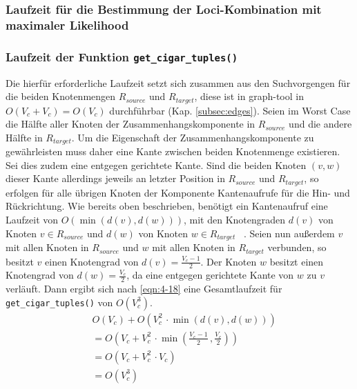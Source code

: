 \subsubsection{Laufzeit für die Bestimmung der Loci-Kombination mit maximaler Likelihood}

\subsubsection{Laufzeit der Funktion \lstinline|get_cigar_tuples()|}

Die hierfür erforderliche Laufzeit setzt sich zusammen aus den Suchvorgengen für die beiden Knotenmengen $ R_{source} $ und $ R_{target} $, diese ist in graph-tool in $O(V_{c} + V_{c}) = O(V_{c})$ durchführbar (Kap. \ref{subsec:edges}). Seien im Worst Case die Hälfte aller Knoten der Zusammenhangskomponente in $ R_{source} $ und die andere Hälfte in $ R_{target} $. Um die Eigenschaft der Zusammenhangskomponente zu gewährleisten muss daher eine Kante zwischen beiden Knotenmenge existieren. Sei dies zudem eine entgegen gerichtete Kante. Sind die beiden Knoten $ (v, w) $ dieser Kante allerdings jeweils an letzter Position in $ R_{source} $ und $ R_{target} $, so erfolgen für alle übrigen Knoten der Komponente Kantenaufrufe für die Hin- und Rückrichtung. Wie bereits oben beschrieben, benötigt ein Kantenaufruf eine Laufzeit von $ O(\min (d(v), d(w)))$, mit den Knotengraden $d(v) $ von Knoten $v \in R_{source}$ und $ d(w) $ von Knoten $ w \in R_{target} $ ~\cite{docs_graph_tool}. Seien nun außerdem $ v $ mit allen Knoten in $ R_{source} $ und $ w $ mit allen Knoten in $ R_{target} $ verbunden, so besitzt $v$ einen Knotengrad von $ d(v) = \frac{V_{c}-1}{2} $. Der Knoten $ w $ besitzt einen Knotengrad von $ d(w) = \frac{V_{c}}{2} $, da eine entgegen gerichtete Kante von $w$ zu $v$ verläuft. Dann ergibt sich nach \eqref{eqn:4-18} eine Gesamtlaufzeit für \lstinline|get_cigar_tuples()| von $ O(V_{c}^3) $. \\

\begin{equation} \label{eqn:4-18}
\tag{4-18}
\begin{aligned}
&\ {} O(V_{c}) + O(V_{c}^2 \, \cdotp \min (d(v), d(w)))  \\
& \ = O\left( V_{c} + V_{c}^2 \, \cdotp \min \left( \frac{V_{c}-1}{2}\,, \frac{V_{c}}{2}\right) \right) \\
&\ = O(V_{c} + V_{c}^2 \, \cdotp V_{c}) \\
&\ = O(V_{c}^3) \\
\end{aligned}
\end{equation}

